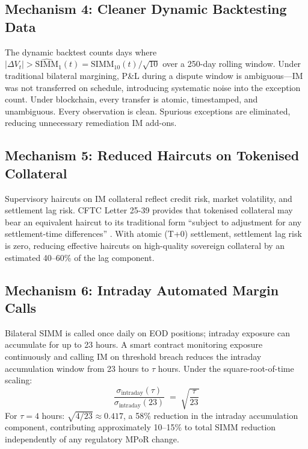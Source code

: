 \documentclass[12pt,letterpaper]{article}
\numberwithin{equation}{section}
\theoremstyle{remark}
\newcommand{\SIMM}{\mathrm{SIMM}}
\begin{document}
\subsection{Mechanism 4: Cleaner Dynamic Backtesting Data}

The dynamic backtest counts days where $|\Delta V_t| >
\widehat{\SIMM}_1(t) = \SIMM_{10}(t)/\sqrt{10}$ over a 250-day rolling
window. Under traditional bilateral margining, P\&L during a dispute
window is ambiguous---IM was not transferred on schedule, introducing
systematic noise into the exception count. Under blockchain, every
transfer is atomic, timestamped, and unambiguous. Every observation is
clean. Spurious exceptions are eliminated, reducing unnecessary
remediation IM add-ons.

\subsection{Mechanism 5: Reduced Haircuts on Tokenised Collateral}

Supervisory haircuts on IM collateral reflect credit risk, market
volatility, and settlement lag risk. CFTC Letter 25-39 provides that
tokenised collateral may bear an equivalent haircut to its traditional
form ``subject to adjustment for any settlement-time differences''
\citep{cftc_2025}. With atomic (T+0) settlement, settlement lag risk is
zero, reducing effective haircuts on high-quality sovereign collateral
by an estimated 40--60\% of the lag component.

\subsection{Mechanism 6: Intraday Automated Margin Calls}

Bilateral SIMM is called once daily on EOD positions; intraday exposure
can accumulate for up to 23 hours. A smart contract monitoring exposure
continuously and calling IM on threshold breach reduces the intraday
accumulation window from 23 hours to $\tau$ hours. Under the
square-root-of-time scaling:
\begin{equation}
  \frac{\sigma_{\text{intraday}}(\tau)}{\sigma_{\text{intraday}}(23)}
  \;=\;\sqrt{\frac{\tau}{23}}
  \label{eq:intraday}
\end{equation}
For $\tau = 4$ hours: $\sqrt{4/23} \approx 0.417$, a 58\% reduction in
the intraday accumulation component, contributing approximately 10--15\%
to total SIMM reduction independently of any regulatory MPoR change.
\end{document}
